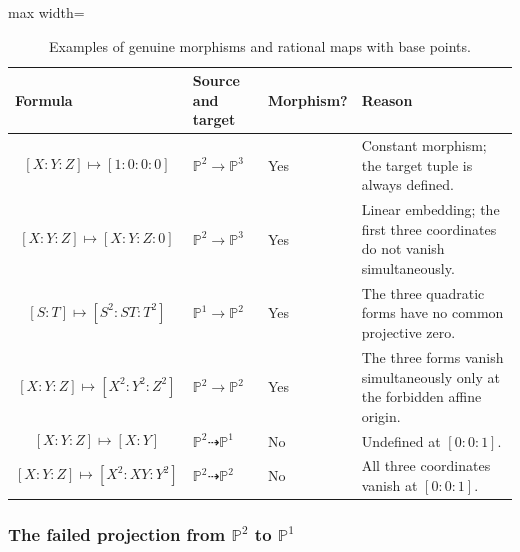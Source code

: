 \documentclass[12pt,a4paper]{article}
\providecommand{\Pj}{\mathbb P}
\theoremstyle{notespace}
\begin{document}
\begin{table}[htbp]
	\centering
	\renewcommand{\arraystretch}{1.45}
	\begin{adjustbox}{max width=\textwidth}
		\begin{tabular}{|p{5.8cm}|p{4.5cm}|p{2.2cm}|p{5.4cm}|}
			\hline
			\textbf{Formula}
			&
			\textbf{Source and target}
			&
			\textbf{Morph\-ism?}
			&
			\textbf{Reason}
			\\
			\hline
			\[
			[X:Y:Z]\longmapsto[1:0:0:0]
			\]
			&
			\(\Pj^2\to\Pj^3\)
			&
			Yes
			&
			Constant morphism; the target tuple is always defined.
			\\
			\hline
			\[
			[X:Y:Z]\longmapsto[X:Y:Z:0]
			\]
			&
			\(\Pj^2\to\Pj^3\)
			&
			Yes
			&
			Linear embedding; the first three coordinates do not vanish simultaneously.
			\\
			\hline
			\[
			[S:T]\longmapsto[S^2:ST:T^2]
			\]
			&
			\(\Pj^1\to\Pj^2\)
			&
			Yes
			&
			The three quadratic forms have no common projective zero.
			\\
			\hline
			\[
			[X:Y:Z]\longmapsto[X^2:Y^2:Z^2]
			\]
			&
			\(\Pj^2\to\Pj^2\)
			&
			Yes
			&
			The three forms vanish simultaneously only at the forbidden affine origin.
			\\
			\hline
			\[
			[X:Y:Z]\longmapsto[X:Y]
			\]
			&
			\(\Pj^2\dashrightarrow\Pj^1\)
			&
			No
			&
			Undefined at \([0:0:1]\).
			\\
			\hline
			\[
			[X:Y:Z]\longmapsto[X^2:XY:Y^2]
			\]
			&
			\(\Pj^2\dashrightarrow\Pj^2\)
			&
			No
			&
			All three coordinates vanish at \([0:0:1]\).
			\\
			\hline
		\end{tabular}
	\end{adjustbox}
	\caption{Examples of genuine morphisms and rational maps with base points.}
\end{table}

\subsubsection{The failed projection from \(\Pj^2\) to \(\Pj^1\)}
\end{document}

